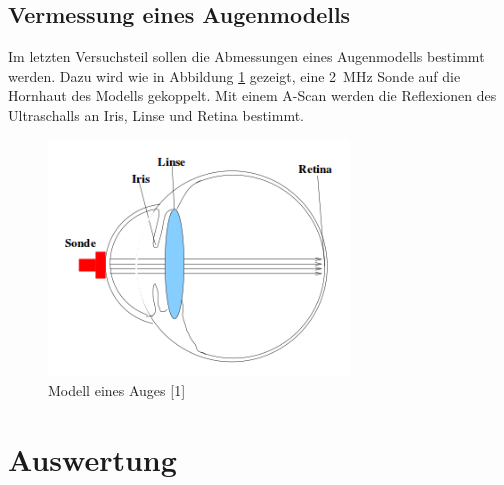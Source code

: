 \documentclass[11pt,ngerman,a4paper]{article}
\begin{document}
\subsection{Vermessung eines  Augenmodells}
Im letzten Versuchsteil sollen die Abmessungen eines Augenmodells bestimmt werden. Dazu wird wie in Abbildung \ref{auge} gezeigt, eine \SI{2}{\mega\hertz} Sonde auf die Hornhaut des Modells gekoppelt. Mit einem A-Scan werden die Reflexionen des Ultraschalls an Iris, Linse und Retina bestimmt.
\begin{figure}[h]
\includegraphics[width=8cm]{augebild.png}
\caption{Modell eines Auges [1]}
\label{auge}
\end{figure}



\section{Auswertung}
\end{document}

